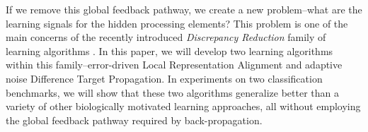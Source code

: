 \documentclass[letterpaper]{article} %
\begin{document}
If we remove this global feedback pathway, we create a new problem--what are the learning signals for the hidden processing elements? This problem is one of the main concerns of the recently introduced \emph{Discrepancy Reduction} family of learning algorithms \cite{ororbia2017learning}.
In this paper, we will develop two learning algorithms within this family--error-driven Local Representation Alignment and adaptive noise Difference Target Propagation. In experiments on two classification benchmarks, we will show that these two algorithms generalize better than a variety of other biologically motivated learning approaches, all without employing the global feedback pathway required by back-propagation.
\end{document}
